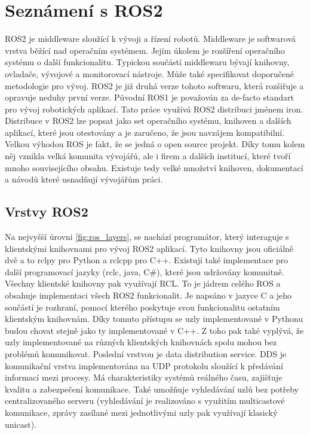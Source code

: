 \section{Seznámení s ROS2}
ROS2 je middleware sloužící k vývoji a řízení robotů. Middleware je softwarová vrstva běžící nad operačním systémem. Jejím úkolem je rozšíření operačního systému o další funkcionalitu. Typickou součástí middlewaru bývají knihovny, ovladače, vývojové a monitorovací nástroje. Může také specifikovat doporučené metodologie pro vývoj. ROS2 je již druhá verze tohoto softwaru, která rozšiřuje a opravuje neduhy první verze. Původní ROS1 je považován za de-facto standart pro vývoj robotických aplikací.
Tato práce využívá ROS2 distribuci jménem iron. Distribuce v ROS2 lze popsat jako set operačního systému, knihoven a dalších aplikací, které jsou otestovány a je zaručeno, že jsou navzájem kompatibilní. Velkou výhodou ROS je fakt, že se jedná o open source projekt. Díky tomu kolem něj vznikla velká komunita vývojářů, ale i firem a dalších institucí, které tvoří mnoho souvisejícího obsahu. Existuje tedy velké množství knihoven, dokumentací a návodů které usnadňují vývojářům práci. \cite[str:~1-5]{ros2_introduction}

\subsection*{Vrstvy ROS2}
Na nejvyšší úrovni \ref{fig:ros_layers}, se nachází programátor, který interaguje s klientskými knihovnami pro vývoj ROS2 aplikací. Tyto knihovny jsou oficiálně dvě a to rclpy pro Python a rclcpp pro C++. Existují také implementace pro další programovací jazyky (rclc, java, C\#), které jsou udržovány komunitně. Všechny klientské knihovny pak využívají RCL. To je jádrem celého ROS a obsahuje implementaci všech ROS2 funkcionalit. Je napsáno v jazyce C a jeho součástí je rozhraní, pomocí kterého poskytuje svou funkcionalitu ostatním klientským knihovnám. Díky tomuto přístupu se uzly implementované v Pythonu budou chovat stejně jako ty implementované v C++. Z toho pak také vyplývá, že uzly implementované na různých klientských knihovnách spolu mohou bez problémů komunikovat.
Poslední vrstvou je data distribution service. DDS je komunikační vrstva implementována na UDP protokolu sloužící k předávání informací mezi procesy. Má charakteristiky systémů reálného času, zajišťuje kvalitu a zabezpečení komunikace. Také umožňuje vyhledávání uzlů bez potřeby centralizovaného serveru (vyhledávání je realizováno s využitím multicastové komunikace, zprávy zasílané mezi jednotlivými uzly pak využívají klasický unicast). \cite[str:~13-15]{ros2_introduction}

